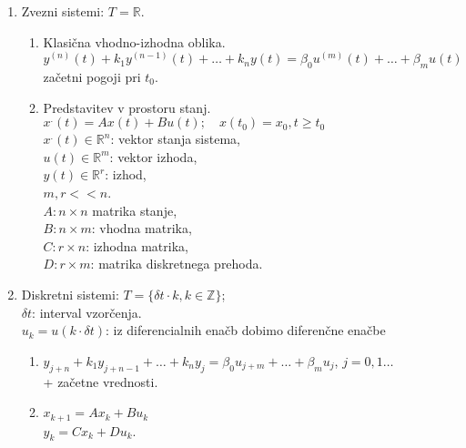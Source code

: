 \documentclass[a4paper, 12pt]{book}
\theoremstyle{definition}
\theoremstyle{remark}
\newcommand{\Z}{\mathbb{Z}}
\newcommand{\R}{\mathbb{R}}
\begin{document}
\begin{enumerate}[label=\alph*]
    \item Zvezni sistemi: $T = \R$.
    \begin{enumerate}[label=a\arabic*)]
        \item Klasična vhodno-izhodna oblika. \\
            $y^{(n)}(t) + k_1 y^{(n-1)}(t) + \dots + k_n y(t) = \beta_0 u^{(m)}(t) + \dots + \beta_m u(t)$ \\
            začetni pogoji pri $t_0$.
        \item Predstavitev v prostoru stanj. \\
            $x^{.}(t) = A x(t) + B u(t); \quad x(t_0) = x_0, t \geq t_0$ \\
            $x^{.}(t) \in \R^n$: vektor stanja sistema, \\
            $u(t) \in \R^m$: vektor izhoda, \\
            $y(t) \in \R^r$: izhod, \\
            $m, r << n$. \\
            $A: n \times n$ matrika stanje, \\
            $B: n \times m$: vhodna matrika, \\
            $C: r \times n$: izhodna matrika, \\
            $D: r \times m$: matrika diskretnega prehoda.
    \end{enumerate}
    \item Diskretni sistemi: $T = \{\delta t \cdot k, k \in \Z\}$; \\
        $\delta t$: interval vzorčenja. \\
        $u_k = u(k \cdot \delta t)$: iz diferencialnih enačb dobimo diferenčne enačbe
        \begin{enumerate}[label=b\arabic*)]
            \item $y_{j+n} + k_1 y_{j+n-1} + \dots + k_n y_j = \beta_0 u_{j+m} + \dots +  \beta_m u_j$,
                $j = 0, 1 \dots$ \\
                + začetne vrednosti.
            \item $x_{k+1} = A x_k + B u_k$ \\
                $y_k = C x_k + D u_k$.
        \end{enumerate}
\end{enumerate}
\end{document}
